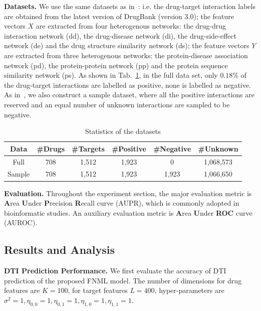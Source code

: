 \documentclass[sigconf,anonymous]{acmart}
\begin{document}
\textbf{Datasets.} %
We use the same datasets as in~\cite{Luo2017Network}: i.e. the drug-target interaction labels are obtained from the latest version of DrugBank (version 3.0); the feature vectors $X$ are extracted from four heterogenous networks: the drug-drug interaction network (dd), the drug-disease network (di), the drug-side-effect network (de) and the drug structure similarity network (ds); the feature vectors $Y$ are extracted from three heterogenous networks: the protein-disease association network (pd), the protein-protein network (pp) and the protein sequence similarity network (ps). As shown in Tab.~\ref{tab:data}, in the full data set, only $0.18\%$ of the drug-target interactions are labelled as positive, none is labelled as negative. As in~\cite{Luo2017Network}, we also construct a sample dataset, where all the positive interactions are reserved and an equal number of unknown interactions are sampled to be negative.
\begin{table}[htp]
\caption{Statistics of the datasets}\label{tab:data}
\vspace*{-10pt}
\small
\begin{tabular}{|c|c|c|c|c|c|}
\hline
Data & \#Drugs & \#Targets & \#Positive & \#Negative & \#Unknown \\\hline
Full & 708 & 1,512 & 1,923 & 0 & 1,068,573 \\\hline
Sample & 708 & 1,512 & 1,923 & 1,923 & 1,066,650 \\\hline
\end{tabular}
\vspace*{-5pt}
\end{table}%



\textbf{Evaluation.} Throughout the experiment section, the major evaluation metric is \textbf{A}rea \textbf{U}nder \textbf{P}recision \textbf{R}ecall curve (AUPR), which is commonly adopted in bioinformatic studies. An auxiliary evaluation metric is \textbf{A}rea \textbf{U}nder \textbf{ROC} curve (AUROC).

\subsection{Results and Analysis}
\textbf{DTI Prediction Performance.} We first evaluate the accuracy of DTI prediction of the proposed FNML model. The number of dimensions for drug features are $K=100$, for target features $L=400$, hyper-parameters are $\sigma^2=1,\eta_{0,0}=1,\eta_{0,1}=1,\eta_{1,0}=1,\eta_{1,1}=1$. 
\end{document}
